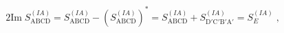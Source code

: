 \begin{equation}
\label{3-4}
2\mathrm{Im}\; S_{\mathrm{ABCD}}^{(IA)} = S_{\mathrm{ABCD}}^{(IA)} - 
(S_{\mathrm{ABCD}}^{(IA)})^* = S_{\mathrm{ABCD}}^{(IA)} + 
S_{\mathrm{D'C'B'A'}}^{(IA)} = S_E^{(IA)}\;,
\end{equation}

